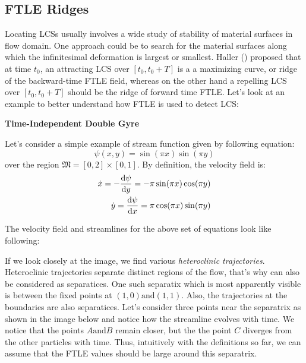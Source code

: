 \subsection{FTLE Ridges}
Locating LCSs usually involves a wide study of stability of material surfaces in flow domain. One approach could be to search for the material surfaces along which the infinitesimal deformation is largest or smallest. Haller () proposed that at time $t_{0}$, an attracting LCS over $ [t_{0}, t_{0}+T] $ is a a maximizing curve, or ridge of the backward-time FTLE field, whereas on the other hand a repelling LCS over $ [t_{0}, t_{0}+T] $ should be the ridge of forward time FTLE. Let's look at an example to better understand how FTLE is used to detect LCS:
\begin{exmp}
	\textbf{Time-Independent Double Gyre}
	
	Let's consider a simple example of stream function given by following equation:
	\begin{equation}
		\psi (x,y) = \sin (\pi x) \sin(\pi y)
	\end{equation}
	over the region $ \mathfrak{M} = [0,2]\times[0,1] $. By definition, the velocity field is:
	\begin{equation}
		\begin{split}				
			\dot{x} = -\frac{\mathop{}\!\mathrm{d} \psi}{\mathop{}\!\mathrm{d} y} = - \pi \sin(\pi x) \cos(\pi y) \\
			\dot{y} = \frac{\mathop{}\!\mathrm{d} \psi}{\mathop{}\!\mathrm{d} x} = \pi \cos(\pi x) \sin(\pi y)
		\end{split}	
	\end{equation} 
\end{exmp}

The velocity field and streamlines for the above set of equations look like following:


If we look closely at the image, we find various \textit{heteroclinic trajectories}. Heteroclinic trajectories separate distinct regions of the flow, that's why can also be considered as separatices. One such separatix which is most apparently visible is between the fixed points at $ (1,0) \text{and} (1,1)$. Also, the trajectories at the boundaries are also separatices. Let's consider three points near the separatrix as shown in the image below and notice how the streamline evolves with time. We notice that the points $ A \text{and} B$ remain closer, but the the point $ C$ diverges from the other particles with time. Thus, intuitively with the definitions so far, we can assume that the FTLE values should be large around this separatrix. 

